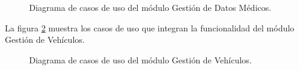 \begin{figure}[htpb!]
	\begin{center}
		\caption{Diagrama de casos de uso del módulo Gestión de Datos Médicos. \label{fig:casosUso:Medi}}
	\end{center}
\end{figure}
\clearpage
La figura \ref{fig:casosUso:Vehi} muestra los casos de uso que integran la funcionalidad del módulo Gestión de Vehículos.

\begin{figure}[htpb!]
	\begin{center}
		\caption{Diagrama de casos de uso del módulo Gestión de Vehículos. \label{fig:casosUso:Vehi}}
	\end{center}
\end{figure}
\clearpage
